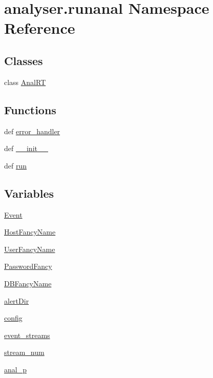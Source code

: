 \hypertarget{namespaceanalyser_1_1runanal}{\section{analyser.\-runanal Namespace Reference}
\label{namespaceanalyser_1_1runanal}
}
\subsection*{Classes}
\begin{DoxyCompactItemize}
\item 
class \hyperlink{classanalyser_1_1runanal_1_1_anal_r_t}{Anal\-R\-T}
\end{DoxyCompactItemize}
\subsection*{Functions}
\begin{DoxyCompactItemize}
\item 
def \hyperlink{namespaceanalyser_1_1runanal_a3b76ecd0893d712faf3d01ecda9bcf60}{error\-\_\-handler}
\item 
def \hyperlink{namespaceanalyser_1_1runanal_ae52cd6ae7d15c438c57923641d847356}{\-\_\-\-\_\-init\-\_\-\-\_\-}
\item 
def \hyperlink{namespaceanalyser_1_1runanal_af11edd15ec5943a22e056ffdef4f36f6}{run}
\end{DoxyCompactItemize}
\subsection*{Variables}
\begin{DoxyCompactItemize}
\item 
\hyperlink{namespaceanalyser_1_1runanal_aa355c53514295960f20266a42d192130}{Event}
\item 
\hyperlink{namespaceanalyser_1_1runanal_a1830afc928748a4ccdc0bddf4d42209f}{Host\-Fancy\-Name}
\item 
\hyperlink{namespaceanalyser_1_1runanal_a8a90baaed28192ee2dafa5a4843ae9ba}{User\-Fancy\-Name}
\item 
\hyperlink{namespaceanalyser_1_1runanal_a9089837b51868e32b3664408ec2d3350}{Password\-Fancy}
\item 
\hyperlink{namespaceanalyser_1_1runanal_a678549712dd734c6ee83e26220c84854}{D\-B\-Fancy\-Name}
\item 
\hyperlink{namespaceanalyser_1_1runanal_a4fd8a63d8ddd676696968c5d5665516b}{alert\-Dir}
\item 
\hyperlink{namespaceanalyser_1_1runanal_ad6f383ab285c12f10972f2a0a1e57d41}{config}
\item 
\hyperlink{namespaceanalyser_1_1runanal_a31eec460fdef7c895d6a4ed32dd6a46d}{event\-\_\-streams}
\item 
\hyperlink{namespaceanalyser_1_1runanal_a9ab10ca739edd64bcf02f5ae3a25fb24}{stream\-\_\-num}
\item 
\hyperlink{namespaceanalyser_1_1runanal_a15dde1b046083c22dd97b40c2b73d996}{anal\-\_\-p}
\end{DoxyCompactItemize}


